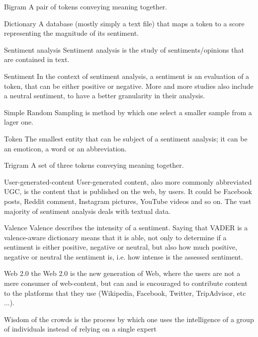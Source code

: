 	\begin{glossy}
		\item [Bigram] A pair of tokens conveying meaning together.
		\item [Dictionary] A database (mostly simply a text file) that maps a token to a score representing the magnitude of its sentiment.
		\item [Sentiment analysis] Sentiment analysis is the study of sentiments/opinions that are contained in text.
		\item[Sentiment] In the context of sentiment analysis, a sentiment is an evaluation of a token, that can be either positive or negative. More and more studies also include a neutral sentiment, to have a better granularity in their analysis.
		\item [Simple Random Sampling] is method by which one select a smaller sample from a lager one.
		\item [Token] The smallest entity that can be subject of a sentiment analysis; it can be an emoticon, a word or an abbreviation.
		\item [Trigram] A set of three tokens conveying meaning together.
		\item [User-generated-content] User-generated content, also more commonly abbreviated UGC, is the content that is published on the web, by users. It could be Facebook posts, Reddit comment, Instagram pictures, YouTube videos and so on. The vast majority of sentiment analysis deals with textual data.
		\item [Valence] Valence describes the intensity of a sentiment. Saying that VADER is a valence-aware dictionary means that it is able, not only to determine if a sentiment is either positive, negative or neutral, but also how much positive, negative or neutral the sentiment is, i.e. how intense is the assessed sentiment.
		\item [Web 2.0] the Web 2.0 is the new generation of Web, where the users are not a mere consumer of web-content, but can and is encouraged to contribute content to the platforms that they use (Wikipedia, Facebook, Twitter, TripAdvisor, etc ...).
		\item [Wisdom of the crowds] is the process by which one uses the intelligence of a group of individuals instead of relying on a single expert
	\end{glossy}
	